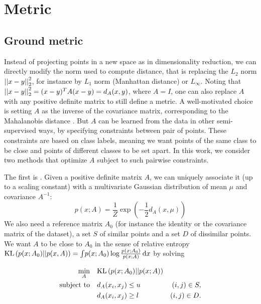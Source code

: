 \section{Metric}
\label{sec:metric}

\subsection{Ground metric}

Instead of projecting points in a new space as in dimensionality reduction, we
can directly modify the norm used to compute distance, that is replacing the
$L_2$ norm $\left|\left|x-y\right|\right|_2^2$, for instance by $L_1$ norm (Manhattan distance)
or $L_\infty$. Noting that $\left|\left|x-y\right|\right|_2^2 = (x-y)^T A (x-y) = d_A(x,y)$,
where $A=I$, one can also replace $A$ with any positive definite matrix to still
define a metric. A well-motivated choice is setting $A$ as the inverse of the
covariance matrix, corresponding to the Mahalanobis distance
\autocite{Mahalanobis36}. But $A$ can be learned from the data in other
semi-supervised ways, by specifying constraints between pair of points. These
constraints are based on class labels, meaning we want points of the same class
to be close and points of different classes to be set apart. In this work, we
consider two methods that optimize $A$ subject to such pairwise constraints.

The first is 
\autocite{InfoMetric07}. Given a positive definite matrix $A$, we can uniquely
associate it (up to a scaling constant) with a multivariate Gaussian
distribution of mean $\mu$ and covariance $A^{-1}$: \[p(x; A) =
\frac{1}{Z}\exp\left(-\frac{1}{2}d_A(x, \mu)\right)\] We also need a reference
matrix $A_0$ (for instance the identity or the covariance matrix of the
dataset), a set $S$ of similar points and a set $D$ of dissimilar points. We
want $A$ to be close to $A_0$ in the sense of relative entropy $\mathrm{KL}\left(p(x;
A_0)||p(x,A)\right) = \int \! p(x; A_0) \log\frac{p(x; A_0)}{p(x; A)}\, \mathrm{d}x$
by solving

\begin{align*}
	\min_A &\quad \mathrm{KL}\left(p(x; A_0)||p(x; A)\right) &\quad\\
	\text{subject to} &\quad d_A(x_i, x_j) \leq u &(i,j) \in S,\\
 &\quad d_A(x_i, x_j) \geq l &(i,j) \in D.
\end{align*}

